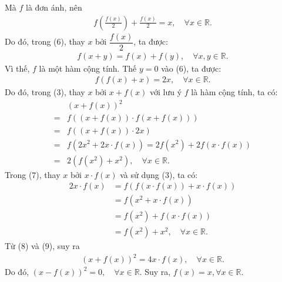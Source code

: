 \begin{multicols}{2}
	Mà $f$ là đơn ánh, nên
	\begin{align*}
		f\left( {\frac{{f\left( x \right)}}{2}} \right) + \frac{{f\left( x \right)}}{2} = x, \quad\forall x \in \mathbb{R}.
	\end{align*}
	Do đó, trong ($6$), thay $x$ bởi  $\dfrac{f(x)}{2}$, ta được:
	\begin{align*}
		f\left( {x + y} \right) = f\left( x \right) + f\left( y \right), \quad\forall x,y \in \mathbb{R}.
	\end{align*}
	Vì thế, $f$  là một hàm cộng tính.
	\vskip 0.05cm
	Thế $y = 0$ vào ($6$), ta được:
	\begin{align*}
		f\left( {f\left( x \right) + x} \right) = 2x, \quad\forall x \in \mathbb{R}. \tag{$7$}
	\end{align*}
	Do đó, trong ($3$), thay $x$ bởi $x + f(x)$  với lưu ý $f$  là hàm cộng tính, ta có:
	\begin{align*}
			&{\left( {x + f\left( x \right)} \right)^2} \\
			= &f\left( {\left( {x + f\left( x \right)} \right) \cdot f\left( {x + f\left( x \right)} \right)} \right) \\
			= &f\left( {\left( {x + f\left( x \right)} \right) \cdot 2x} \right)\\
			= &f\left(\! {2{x^2} \!+\! 2x \!\cdot\! f\left( x \right)} \!\right) \!=\! 2f\!\left(\! {{x^2}} \right) \!+\! 2f\left( {x \!\cdot\! f\left( x \right)} \right)\\
			= &2\left( {f\left( {{x^2}} \right) + {x^2}} \right),\quad \forall x\in \mathbb{R}. \tag{$8$}
	\end{align*}
	Trong ($7$), thay $x$ bởi $x \cdot f(x)$  và sử dụng ($3$), ta có:
	\begin{align*}
		2x \cdot f\left( x \right) &= f\left( {f\left( {x \cdot f\left( x \right)} \right) + x \cdot f\left( x \right)} \right) \\[-0.4ex]
		&= f\left( {{x^2} + x \cdot f\left( x \right)} \right)\\[-0.4ex]
		&= f\left( {{x^2}} \right) + f\left( {x \cdot f\left( x \right)} \right) \\[-0.4ex]
		&= f\left( {{x^2}} \right) + {x^2}, \quad\forall x\in \mathbb{R}. \tag{$9$}
	\end{align*}
	Từ ($8$) và ($9$), suy ra
	\begin{align*}
		{\left( {x + f\left( x \right)} \right)^2} = 4x \cdot f\left( x \right),\quad\forall x \in \mathbb{R}.
	\end{align*}
	Do đó,  ${\left( {x - f\left( x \right)} \right)^2} = 0, \quad\forall x\in \mathbb{R}$. Suy ra,  $f(x) = x, \forall x \in \mathbb{R}$.

\end{multicols}
